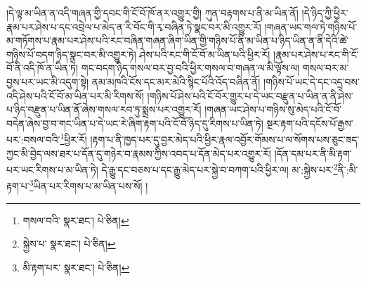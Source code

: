 །དེ་ལྟ་མ་ཡིན་ན་འདི་གཞན་གྱི་དབང་གི་ངོ་བོ་ཁོ་ནར་འགྱུར་གྱི། ཀུན་བརྟགས་པ་ནི་མ་ཡིན་ནོ། །དེ་ཉིད་ཀྱི་ཕྱིར་རྣམ་པར་ཤེས་པ་དང་འབྲེལ་པ་མེད་ན་རི་བོང་གི་རྭ་བཞིན་ཏེ་སྣང་བར་མི་འགྱུར་རོ། །གཞན་ཡང་གལ་ཏེ་གཉིས་པོ་མ་གཏོགས་པ་རྣམ་པར་ཤེས་པའི་རང་བཞིན་གཞན་ཞིག་ཡིན་གྱི་གཉིས་པོ་ནི་མ་ཡིན་པ་ཉིད་ཡིན་ན་ནི་དེའི་ཚེ་གཉིས་པོ་བདག་ཉིད་སྣང་བར་མི་འགྱུར་ཏེ། ཤེས་པའི་རང་གི་ངོ་བོ་མ་ཡིན་པའི་ཕྱིར་རོ། །རྣམ་པར་ཤེས་པ་རང་གི་ངོ་བོ་ནི་འདི་ཁོ་ན་ཡིན་ཏེ། གང་བདག་ཉིད་གསལ་བར་བྱ་བའི་ཕྱིར་གསལ་བ་གཞན་ལ་མི་ལྟོས་ལ། གསལ་བར་མ་བྱས་པར་ཡང་མི་འདུག་སྟེ། ནམ་མཁའི་ངོས་དང་མར་མེའི་སྙིང་པོའི་འོད་བཞིན་ནོ། །གཉིས་པོ་ཡང་དེ་དང་འདྲ་བས་འདི་ཤེས་པའི་ངོ་བོ་མ་ཡིན་པར་མི་རིགས་སོ། །གཉིས་པོ་ཤེས་པའི་ངོ་བོར་གྱུར་པ་དེ་ཡང་བརྫུན་པ་ཡིན་ན་ནི་ཤེས་པ་ཉིད་བརྫུན་པ་ཡིན་ནོ་ཞེས་གསལ་རབ་ཏུ་སྨྲས་པར་འགྱུར་རོ། །གཞན་ཡང་ཤེས་པ་གཉིས་སུ་མེད་པའི་ངོ་བོ་བདེན་ཞེས་བྱ་བ་གང་ཡིན་པ་དེ་ཡང་རེ་ཞིག་རྟག་པའི་ངོ་བོ་ཉིད་དུ་རིགས་པ་ཡིན་ཏེ། སྔར་རྟག་པའི་དངོས་པོ་རྒྱས་པར་:བསལ་བའི་\footnote{གསལ་བའི་  སྣར་ཐང་།  པེ་ཅིན། }ཕྱིར་རོ། །རྟག་པ་ནི་ཁྱད་པར་དུ་བྱར་མེད་པའི་ཕྱིར་རྣལ་འབྱོར་གོམས་པ་ལ་སོགས་པས་ཅུང་ཟད་ཀྱང་མི་བྱེད་ལས་ཐར་པ་དོན་དུ་གཉེར་བ་རྣམས་ཀྱིས་འབད་པ་དོན་མེད་པར་འགྱུར་རོ། །དོན་དམ་པར་ནི་མི་རྟག་པར་ཡང་རིགས་པ་མ་ཡིན་ཏེ། དེ་རྒྱུ་དང་བཅས་པ་དང་རྒྱུ་མེད་པར་སྐྱེ་བ་བཀག་པའི་ཕྱིར་ལ། མ་:སྐྱེས་པར་\footnote{སྐྱེས་པ་  སྣར་ཐང་།  པེ་ཅིན། }ནི་:མི་རྟག་པ་\footnote{མི་རྟག་པར་  སྣར་ཐང་།  པེ་ཅིན། }ཡིན་པར་རིགས་པ་མ་ཡིན་པས་སོ། །
